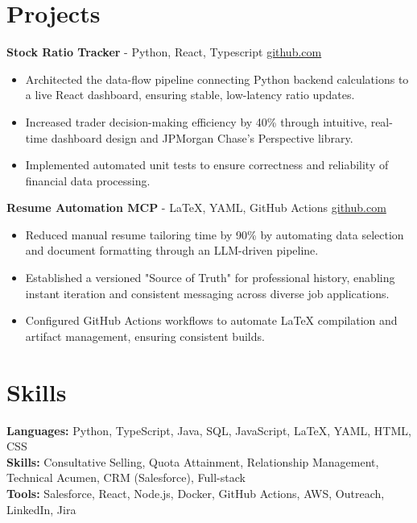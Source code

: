 \documentclass[11pt]{article}       %
\begin{document}
\vspace{-18.5pt}

\section*{Projects}

\textbf{Stock Ratio Tracker}{ - Python, React, Typescript} \hfill \href{https://github.com/Monica20030707/tradingDashboard-UI}{github.com} \\
\vspace{-9pt}
\begin{itemize}
  \item Architected the data-flow pipeline connecting Python backend calculations to a live React dashboard, ensuring stable, low-latency ratio updates.
  \item Increased trader decision-making efficiency by 40\% through intuitive, real-time dashboard design and JPMorgan Chase’s Perspective library.
  \item Implemented automated unit tests to ensure correctness and reliability of financial data processing.
\end{itemize}

\textbf{Resume Automation MCP}{ - LaTeX, YAML, GitHub Actions} \hfill \href{https://github.com/Monica20030707/Tex_OrangeLeaf-mcp}{github.com} \\
\vspace{-9pt}
\begin{itemize}
  \item Reduced manual resume tailoring time by 90\% by automating data selection and document formatting through an LLM-driven pipeline.
  \item Established a versioned "Source of Truth" for professional history, enabling instant iteration and consistent messaging across diverse job applications.
  \item Configured GitHub Actions workflows to automate LaTeX compilation and artifact management, ensuring consistent builds.
\end{itemize}

\vspace{-18.5pt}


\section*{Skills}
\textbf{Languages:} Python, TypeScript, Java, SQL, JavaScript, LaTeX, YAML, HTML, CSS\\
\textbf{Skills:} Consultative Selling, Quota Attainment, Relationship Management, Technical Acumen, CRM (Salesforce), Full-stack\\
\textbf{Tools:} Salesforce, React, Node.js, Docker, GitHub Actions, AWS, Outreach, LinkedIn, Jira\\

\vspace{-6.5pt}
\end{document}
